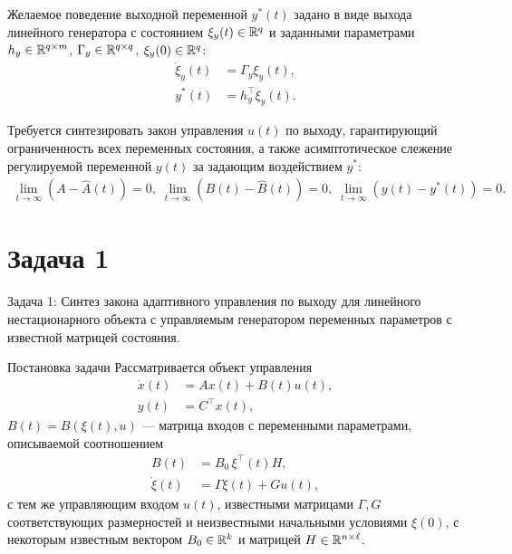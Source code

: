 \begin{frame} \hypertarget{slide\insertframenumber}{}
	Желаемое поведение выходной переменной $y^*(t)$ задано в виде выхода линейного генератора с состоянием $\xi_y(t)\in \mathbb{R}^q$ и заданными параметрами $h_y\in\mathbb{R}^{q\times m}$, $\Gamma_y \in\mathbb{R}^{q\times q}$, $\xi_y(0)\in \mathbb{R}^q$:
	\begin{align}\label{xi_star}
		\dot \xi_y(t)&=\Gamma_y\xi_y(t),\\
		\label{y_star}
		y^*(t)&=h_y^\top\xi_y(t).
	\end{align}
	
	Требуется синтезировать закон управления $u(t)$ по выходу,
	гарантирующий ограниченность всех переменных состояния, а также асимптотическое слежение регулируемой переменной $y(t)$ за задающим воздействием $y^*$:
	\begin{align}
		\label{goal}
		\mathop {\lim }\limits_{t \to \infty } \left( {A  - \hat A(t)} \right) = 0, \;
		\mathop {\lim }\limits_{t \to \infty } \left( {B(t)  - \hat B(t)} \right) = 0, \;
		\mathop {\lim }\limits_{t \to \infty } \left( {y(t)  - y^*(t)} \right) = 0.
	\end{align}
\end{frame}


\section{Задача 1}%
\begin{frame} \hypertarget{slide\insertframenumber}{}
	\centering
	\LARGE Задача 1: Синтез закона адаптивного управления по выходу для линейного нестационарного объекта с управляемым генератором переменных параметров с известной матрицей состояния.
\end{frame}
\begin{frame}{Постановка задачи}
	Рассматривается объект управления
	\begin{align}
		\label{2.1}
		\dot x(t) &= Ax(t) + B(t)u(t),\\
		\label{2.2}
		y(t) &= C^\top x(t),
	\end{align}
	$B(t)=B(\xi(t),u)$ --- матрица входов с переменными параметрами, описываемой соотношением
	\begin{align}	\label{2.3}
		B(t) &= B_0 \,  \xi^\top (t) H,\\
		\label{2.4}
		\dot \xi(t) &=\Gamma \xi(t)+Gu(t),
	\end{align}
	с тем же управляющим входом $u(t)$, известными матрицами $ \Gamma, G$ соответствующих размерностей и неизвестными начальными условиями $\xi(0)$, с некоторым известным вектором $ B_0 \in \mathbb{R}^k$ и матрицей $H\in\mathbb{R}^{n \times \ell}$.
	
\end{frame}


